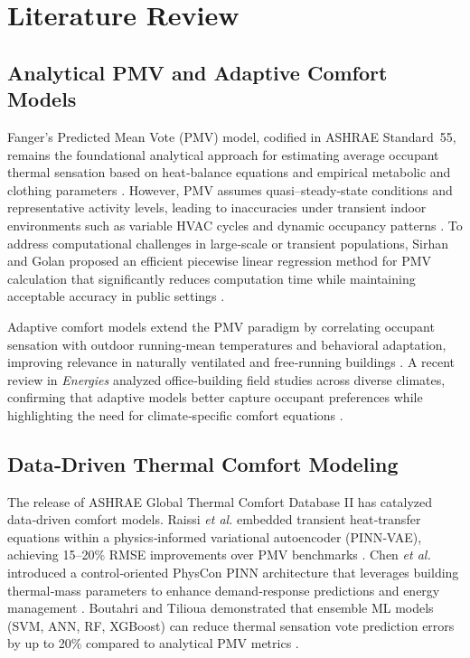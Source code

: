 \section{Literature Review}

\subsection{Analytical PMV and Adaptive Comfort Models}

Fanger’s Predicted Mean Vote (PMV) model, codified in ASHRAE Standard~55, remains the foundational analytical approach for estimating average occupant thermal sensation based on heat‐balance equations and empirical metabolic and clothing parameters \cite{ASHRAE2020}. However, PMV assumes quasi–steady‐state conditions and representative activity levels, leading to inaccuracies under transient indoor environments such as variable HVAC cycles and dynamic occupancy patterns \cite{Run2025Transient}. To address computational challenges in large‐scale or transient populations, Sirhan and Golan proposed an efficient piecewise linear regression method for PMV calculation that significantly reduces computation time while maintaining acceptable accuracy in public settings \cite{Sirhan2021EfficientPMV}.

Adaptive comfort models extend the PMV paradigm by correlating occupant sensation with outdoor running‐mean temperatures and behavioral adaptation, improving relevance in naturally ventilated and free‐running buildings \cite{Yao2022Adaptive}. A recent review in \emph{Energies} analyzed office‐building field studies across diverse climates, confirming that adaptive models better capture occupant preferences while highlighting the need for climate‐specific comfort equations \cite{MDPI2023Adaptive}.

\subsection{Data‐Driven Thermal Comfort Modeling}

The release of ASHRAE Global Thermal Comfort Database II has catalyzed data‐driven comfort models. Raissi \emph{et al.} embedded transient heat‐transfer equations within a physics‐informed variational autoencoder (PINN‐VAE), achieving 15–20\% RMSE improvements over PMV benchmarks \cite{Raissi2022VAE}. Chen \emph{et al.} introduced a control‐oriented PhysCon PINN architecture that leverages building thermal‐mass parameters to enhance demand‐response predictions and energy management \cite{Chen2024PINN}. Boutahri and Tilioua demonstrated that ensemble ML models (SVM, ANN, RF, XGBoost) can reduce thermal sensation vote prediction errors by up to 20\% compared to analytical PMV metrics \cite{Boutahri2024}.


